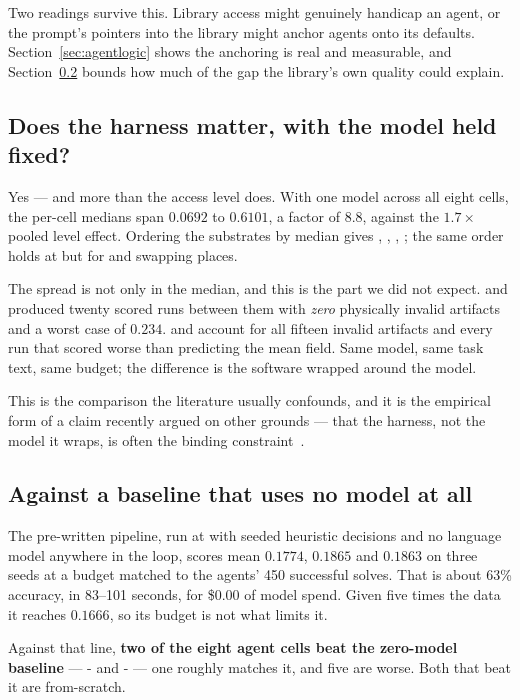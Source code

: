 Two readings survive this. Library access might genuinely handicap an agent, or
the \Ltwo{} prompt's pointers into the library might anchor agents onto its
defaults. Section~\ref{sec:agentlogic} shows the anchoring is real and
measurable, and Section~\ref{sec:vs-baseline} bounds how much of the gap the
library's own quality could explain.

\subsection{Does the harness matter, with the model held fixed?}
\label{sec:harness-effect}

Yes --- and more than the access level does. With one model across all eight
cells, the per-cell medians span $0.0692$ to $0.6101$, a factor of $8.8$,
against the $1.7\times$ pooled level effect. Ordering the substrates by
\Lthree{} median gives , , , ; the same
order holds at \Ltwo{} but for  and  swapping places.

The spread is not only in the median, and this is the part we did not expect.
 and  produced twenty scored runs between them with
\emph{zero} physically invalid artifacts and a worst case of $0.234$. 
and  account for all fifteen invalid artifacts and every run that
scored worse than predicting the mean field. Same model, same task text, same
budget; the difference is the software wrapped around the model.

This is the comparison the literature usually confounds, and it is the
empirical form of a claim recently argued on other grounds --- that the harness,
not the model it wraps, is often the binding
constraint~\citep{zhang2026harness}.

\subsection{Against a baseline that uses no model at all}
\label{sec:vs-baseline}

The pre-written pipeline, run at \Lzero{} with seeded heuristic decisions and no
language model anywhere in the loop, scores mean \relltwo{} $0.1774$, $0.1865$
and $0.1863$ on three seeds at a budget matched to the agents' 450 successful
solves. That is about 63\% accuracy, in 83--101 seconds, for \$0.00 of model
spend. Given five times the data it reaches $0.1666$, so its budget is not what
limits it.

Against that line, \textbf{two of the eight agent cells beat the zero-model
baseline} --- \Lthree{}- and \Lthree{}- --- one roughly
matches it, and five are worse. Both that beat it are from-scratch.

